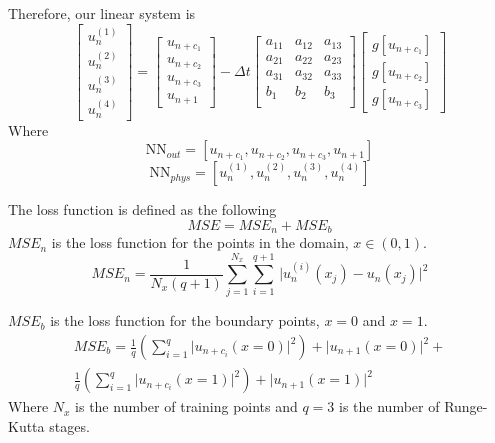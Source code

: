 \documentclass[a4paper, onecolumn, 12pt]{article}
\begin{document}
Therefore, our linear system is 
\begin{equation}
\begin{bmatrix}
u_n^{(1)} \\ u_n^{(2)} \\ u_n^{(3)} \\ u_n^{(4)} 
\end{bmatrix}
=
\begin{bmatrix}
u_{n+c_1} \\ u_{n+c_2} \\ u_{n+c_3} \\ u_{n+1} 
\end{bmatrix}
-
\Delta t
\begin{bmatrix}
a_{11} & a_{12} & a_{13} \\
a_{21} & a_{22} & a_{23} \\
a_{31} & a_{32} & a_{33} \\
b_{1} & b_{2} & b_{3} \\
\end{bmatrix}
\begin{bmatrix}
g[u_{n+c_1}] \\ g[u_{n+c_2}] \\ g[u_{n+c_3}]
\end{bmatrix}
\end{equation}
Where 
$$
\text{NN}_{out} = [u_{n+c_1}, u_{n+c_2}, u_{n+c_3}, u_{n+1}]
$$
$$
\text{NN}_{phys} = [u_n^{(1)}, u_n^{(2)}, u_n^{(3)}, u_n^(4)]
$$

The loss function is defined as the following
\begin{equation}
MSE = MSE_n + MSE_b
\end{equation}
$MSE_n$ is the loss function for the points in the domain, $x \in (0, 1)$.
\begin{equation}
    MSE_n = \frac{1}{N_x  (q+1)}
    \sum_{j=1}^{N_x} \sum_{i=1}^{q+1} \,
    \Big| u^{(i)}_n(x_j) - u_n(x_j) \Big|^2
\end{equation}

$MSE_b$ is the loss function for the boundary points, $x=0$ and $x=1$.
\begin{multline}
MSE_b = \frac{1}{q} \left( \sum_{i=1}^{q} \Big| u_{n+c_i}(x=0) \Big|^2  \right)
+ \Big| u_{n+1}(x=0) \Big|^2 + \\
\frac{1}{q} \left( \sum_{i=1}^{q} \Big| u_{n+c_i}(x=1) \Big|^2  \right)
+ \Big| u_{n+1}(x=1) \Big|^2
\end{multline}
Where $N_x$ is the number of training points and $q = 3$ is the number of Runge-Kutta stages.
\end{document}
